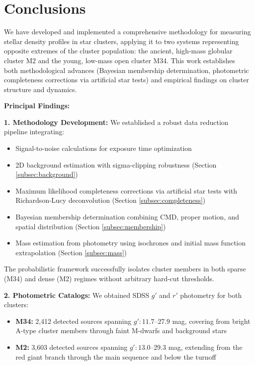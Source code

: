 \documentclass[linenumbers,trackchanges,twocolumn]{aastex701}
\begin{document}
\section{Conclusions} \label{sec:conclusions}

We have developed and implemented a comprehensive methodology for measuring stellar density profiles in star clusters, applying it to two systems representing opposite extremes of the cluster population: the ancient, high-mass globular cluster M2 and the young, low-mass open cluster M34. This work establishes both methodological advances (Bayesian membership determination, photometric completeness corrections via artificial star tests) and empirical findings on cluster structure and dynamics.

\textbf{Principal Findings:}

\textbf{1. Methodology Development:} We established a robust data reduction pipeline integrating:
\begin{itemize}
\item Signal-to-noise calculations for exposure time optimization
\item 2D background estimation with sigma-clipping robustness (Section \ref{subsec:background})
\item Maximum likelihood completeness corrections via artificial star tests with Richardson-Lucy deconvolution (Section \ref{subsec:completeness})
\item Bayesian membership determination combining CMD, proper motion, and spatial distribution (Section \ref{subsec:membership})
\item Mass estimation from photometry using isochrones and initial mass function extrapolation (Section \ref{subsec:mass})
\end{itemize}

The probabilistic framework successfully isolates cluster members in both sparse (M34) and dense (M2) regimes without arbitrary hard-cut thresholds.

\textbf{2. Photometric Catalogs:} We obtained SDSS $g'$ and $r'$ photometry for both clusters:
\begin{itemize}
\item \textbf{M34:} 2,412 detected sources spanning $g': 11.7$--27.9 mag, covering from bright A-type cluster members through faint M-dwarfs and background stars
\item \textbf{M2:} 3,603 detected sources spanning $g': 13.0$--29.3 mag, extending from the red giant branch through the main sequence and below the turnoff
\end{itemize}
\end{document}
